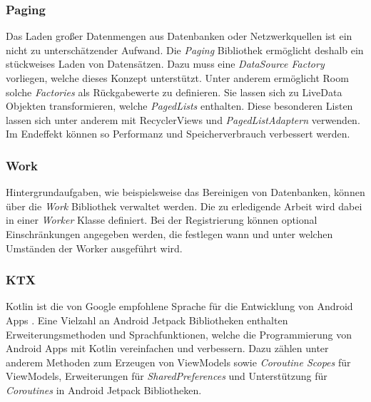 \subsubsection{Paging}
\label{subsubsec:app:jetpack:paging}
Das Laden großer Datenmengen aus Datenbanken oder Netzwerkquellen ist ein nicht zu unterschätzender Aufwand.
Die \textit{Paging} Bibliothek ermöglicht deshalb ein stückweises Laden von Datensätzen.
Dazu muss eine \textit{DataSource Factory} vorliegen, welche dieses Konzept unterstützt.
Unter anderem ermöglicht Room solche \textit{Factories} als Rückgabewerte zu definieren.
Sie lassen sich zu LiveData Objekten transformieren, welche \textit{PagedLists} enthalten.
Diese besonderen Listen lassen sich unter anderem mit RecyclerViews und \textit{PagedListAdaptern} verwenden.
Im Endeffekt können so Performanz und Speicherverbrauch verbessert werden.

\subsubsection{Work}
\label{subsubsec:app:jetpack:work}
Hintergrundaufgaben, wie beispielsweise das Bereinigen von Datenbanken, können über die \textit{Work} Bibliothek verwaltet werden.
Die zu erledigende Arbeit wird dabei in einer \textit{Worker} Klasse definiert.
Bei der Registrierung können optional Einschränkungen angegeben werden, die festlegen wann und unter welchen Umständen der Worker ausgeführt wird.

\subsubsection{KTX}
\label{subsubsec:app:jetpack:extensions}
Kotlin ist die von Google empfohlene Sprache für die Entwicklung von Android Apps \autocite{androidkotlin}.
Eine Vielzahl an Android Jetpack Bibliotheken enthalten Erweiterungsmethoden und Sprachfunktionen, welche die Programmierung von Android Apps mit Kotlin vereinfachen und verbessern.
Dazu zählen unter anderem Methoden zum Erzeugen von ViewModels sowie \textit{Coroutine Scopes} für ViewModels, Erweiterungen für \textit{SharedPreferences} und Unterstützung für \textit{Coroutines} in Android Jetpack Bibliotheken.

